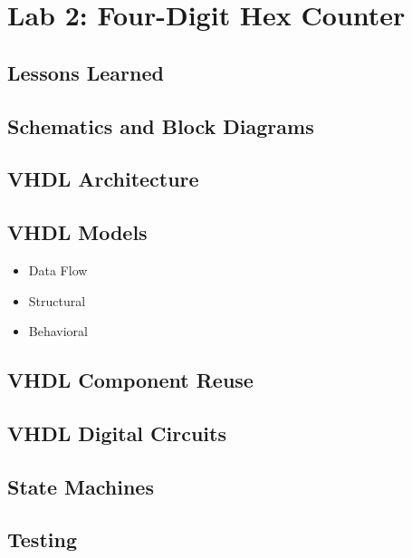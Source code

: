 \chapter{Lab 2: Four-Digit Hex Counter \\
\label{Introduction}}


\section{Lessons Learned
\label{Section::Lessons Learned}}
 \section{Schematics and Block Diagrams}
 \section{VHDL Architecture}
 \section{VHDL Models}
 \begin{itemize}
     \item Data Flow
     \item Structural
     \item Behavioral
\end{itemize}
 \section{VHDL Component Reuse}
 \section{VHDL Digital Circuits}
 \section{State Machines}
 \section{Testing}
